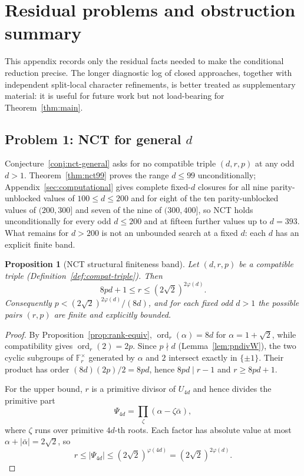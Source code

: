 \documentclass[11pt]{amsart}
\theoremstyle{plain}
\newtheorem{proposition}[theorem]{Proposition}
\theoremstyle{definition}
\theoremstyle{remark}
\numberwithin{equation}{section}
\newcommand{\ord}{\operatorname{ord}}
\newcommand{\F}{\mathbb{F}}
\begin{document}
\appendix

\section{Residual problems and obstruction summary}\label{sec:residual-appendix}

This appendix records only the residual facts needed to make the conditional reduction precise. The longer diagnostic log of closed approaches, together with independent split-local character refinements, is better treated as supplementary material: it is useful for future work but not load-bearing for Theorem~\ref{thm:main}.

\subsection{Problem 1: NCT for general \texorpdfstring{$d$}{d}}\label{sec:nct-problem}

Conjecture~\ref{conj:nct-general} asks for no compatible triple $(d,r,p)$ at any odd $d>1$. Theorem~\ref{thm:nct99} proves the range $d\leq 99$ unconditionally; Appendix~\ref{sec:computational} gives complete fixed-$d$ closures for all nine parity-unblocked values of $100 \leq d \leq 200$ and for eight of the ten parity-unblocked values of $(200, 300]$ and seven of the nine of $(300, 400]$, so NCT holds unconditionally for every odd $d \leq 200$ and at fifteen further values up to $d = 393$. What remains for $d > 200$ is not an unbounded search at a fixed $d$: each $d$ has an explicit finite band.

\begin{proposition}[NCT structural finiteness band]\label{prop:nct-band}
Let $(d, r, p)$ be a compatible triple (Definition~\ref{def:compat-triple}). Then
\[
  8 p d + 1 \leq r \leq (2\sqrt 2)^{2\varphi(d)}.
\]
Consequently $p < (2\sqrt 2)^{2\varphi(d)}/(8d)$, and for each fixed odd $d>1$ the possible pairs $(r,p)$ are finite and explicitly bounded.
\end{proposition}

\begin{proof}
By Proposition~\ref{prop:rank-equiv}, $\ord_r(\alpha)=8d$ for $\alpha=1+\sqrt2$, while compatibility gives $\ord_r(2)=2p$. Since $p\nmid d$ (Lemma~\ref{lem:pndivW}), the two cyclic subgroups of $\F_r^\times$ generated by $\alpha$ and $2$ intersect exactly in $\{\pm1\}$. Their product has order $(8d)(2p)/2=8pd$, hence $8pd\mid r-1$ and $r\geq 8pd+1$.

For the upper bound, $r$ is a primitive divisor of $U_{4d}$ and hence divides the primitive part
\[
  \Psi_{4d}=\prod_{\zeta}(\alpha-\zeta\bar\alpha),
\]
where $\zeta$ runs over primitive $4d$-th roots. Each factor has absolute value at most $\alpha+|\bar\alpha|=2\sqrt2$, so
\[
  r\leq |\Psi_{4d}|\leq (2\sqrt2)^{\varphi(4d)}=(2\sqrt2)^{2\varphi(d)}.
\]
\end{proof}
\end{document}
